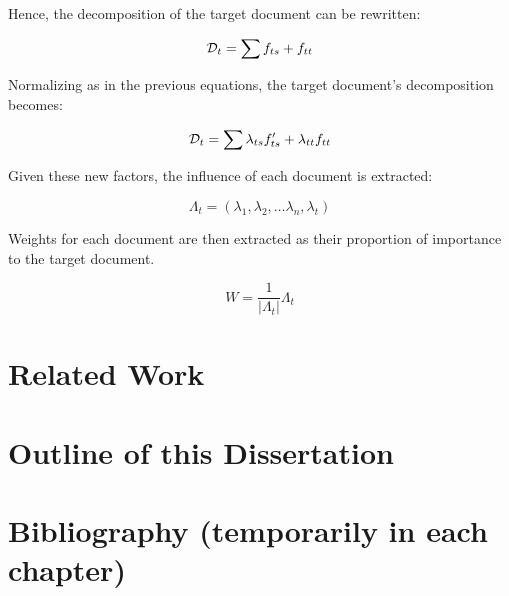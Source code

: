 \documentclass[../dissertation.tex]{subfiles}
\begin{document}
Hence, the decomposition of the target document can be rewritten:

\begin{equation} \label{eq:influence_factors}
  \mathcal{D}_t = \sum f_{ts} + f_{tt}
\end{equation}

Normalizing as in the previous equations, the target
document's decomposition becomes:

\begin{equation} \label{eq:influence_factors_normalized}
  \mathcal{D}_t = \sum \lambda_{ts} f'_{ts} + \lambda_{tt} f_{tt}
\end{equation}

Given these new factors, the influence of each document is extracted:

\begin{equation} \label{eq:document_lambda}
  \Lambda_t = (\lambda_1, \lambda_2, \ldots \lambda_n, \lambda_t)
\end{equation}

Weights for each document are then extracted as their proportion of
importance to the target document.

\begin{equation} \label{eq:document_weights}
  W = \dfrac{1}{|\Lambda_t|} \Lambda_t
\end{equation}

\section{Related Work}

\section{Outline of this Dissertation}

\section{Bibliography (temporarily in each chapter)}


\end{document}
